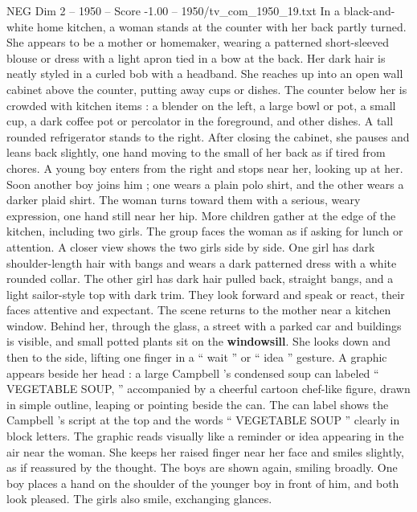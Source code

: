 \begin{textsample}{NEG Dim 2 – 1950 – Score -1.00 – 1950/tv\_com\_1950\_19.txt}  \label{ex:f2_neg_004}
In a black-and-white home kitchen, a woman stands at the counter with her back partly turned.
She appears to be a mother or homemaker, wearing a patterned short-sleeved blouse or dress with a light apron tied in a bow at the back.
Her dark hair is neatly styled in a curled bob with a headband.
She reaches up into an open wall cabinet above the counter, putting away cups or dishes.
The counter below her is crowded with kitchen items : a blender on the left, a large bowl or pot, a small cup, a dark coffee pot or percolator in the foreground, and other dishes.
A tall rounded refrigerator stands to the right.
After closing the cabinet, she pauses and leans back slightly, one hand moving to the small of her back as if tired from chores.
A young boy enters from the right and stops near her, looking up at her.
Soon another boy joins him ; one wears a plain polo shirt, and the other wears a darker plaid shirt.
The woman turns toward them with a serious, weary expression, one hand still near her hip.
More children gather at the edge of the kitchen, including two girls.
The group faces the woman as if asking for lunch or attention.
A closer view shows the two girls side by side.
One girl has dark shoulder-length hair with bangs and wears a dark patterned dress with a white rounded collar.
The other girl has dark hair pulled back, straight bangs, and a light sailor-style top with dark trim.
They look forward and speak or react, their faces attentive and expectant.
The scene returns to the mother near a kitchen window.
Behind her, through the glass, a street with a parked car and buildings is visible, and small potted plants sit on the \textbf{windowsill}.
She looks down and then to the side, lifting one finger in a “ wait ” or “ idea ” gesture.
A graphic appears beside her head : a large Campbell ’s condensed soup can labeled “ VEGETABLE SOUP, ” accompanied by a cheerful cartoon chef-like figure, drawn in simple outline, leaping or pointing beside the can.
The can label shows the Campbell ’s script at the top and the words “ VEGETABLE SOUP ” clearly in block letters.
The graphic reads visually like a reminder or idea appearing in the air near the woman.
She keeps her raised finger near her face and smiles slightly, as if reassured by the thought.
The boys are shown again, smiling broadly.
One boy places a hand on the shoulder of the younger boy in front of him, and both look pleased.
The girls also smile, exchanging glances.

\end{textsample}
